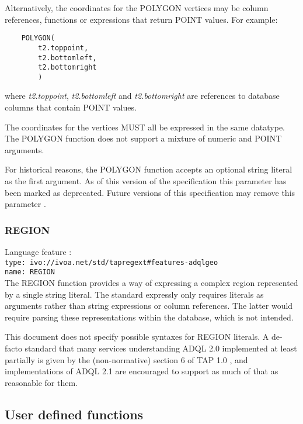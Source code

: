 \documentclass[11pt,a4paper]{ivoa}
\begin{document}
Alternatively, the coordinates for the POLYGON vertices may be column references,
functions or expressions that return POINT values.
For example:
\begin{verbatim}
    POLYGON(
        t2.toppoint,
        t2.bottomleft,
        t2.bottomright
        )
\end{verbatim}
\noindent
where \textit{t2.toppoint}, \textit{t2.bottomleft} and \textit{t2.bottomright}
are references to database columns that contain POINT values.

The coordinates for the vertices MUST all be expressed in the same datatype.
The POLYGON function does not support a mixture of numeric and POINT
arguments.

For historical reasons, the POLYGON function accepts an optional string literal
as the first argument.
As of this version of the specification this parameter has been
marked as deprecated.
Future versions of this specification may remove this parameter
.

\subsubsection{REGION}
\label{sec:functions.geom.region}

{\footnotesize Language feature :}\\
{\footnotesize \verb|type: ivo://ivoa.net/std/tapregext#features-adqlgeo|}\\
{\footnotesize \verb|name: REGION|}\\


The REGION function provides a way of expressing a complex region
represented by a single string literal.  The standard expressly only
requires literals as arguments rather than string expressions or column
references.  The latter would require parsing these representations
within the database, which is not intended.

This document does not specify possible syntaxes for REGION
literals.  A de-facto standard that many services understanding ADQL 2.0
implemented at least partially is given by the (non-normative) section 6
of TAP 1.0 \citep{2010ivoa.spec.0327D}, and implementations of ADQL 2.1 are
encouraged to support as much of that as reasonable for them.

\subsection{User defined functions}
\label{sec:user.functions}
\end{document}
